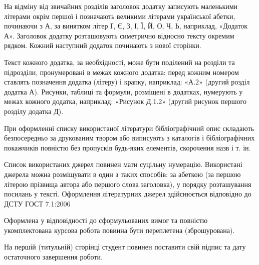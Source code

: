 На відміну від звичайних розділів заголовок додатку записують маленькими літерами окрім першої і позначають великими літерами української абетки, починаючи з А, за винятком літер Ґ, Є, З, І, Ї, Й, О, Ч, Ь, наприклад, «Додаток А».  Заголовок додатку розташовують симетрично відносно тексту окремим рядком. Кожний наступний додаток починають з нової сторінки.

Текст кожного додатка, за необхідності, може бути поділений на розділи та підрозділи, пронумеровані в межах кожного додатка: перед кожним номером ставлять позначення додатка (літеру) і крапку, наприклад: «А.2» (другий розділ додатка А). Рисунки, таблиці та формули, розміщені в додатках, нумерують у межах кожного додатка, наприклад: «Рисунок Д.1.2» (другий рисунок першого розділу додатка Д).

При оформленні списку використаної літератури бібліографічний опис складають безпосередньо за друкованим твором або виписують з каталогів і бібліографічних покажчиків повністю без пропусків будь-яких елементів, скорочення назв і т. ін.

Список використаних джерел повинен мати суцільну нумерацію. Використані джерела можна розміщувати в один з таких способів: за абеткою (за першою літерою прізвища автора або першого слова заголовка), у порядку розташування посилань у тексті. Оформлення літературних джерел здійснюється відповідно до ДСТУ ГОСТ 7.1:2006

Оформлена у відповідності до сформульованих вимог та повністю укомплектована курсова робота повинна бути переплетена (зброшурована).

На першій (титульній) сторінці студент повинен поставити свій підпис та дату остаточного завершення роботи.